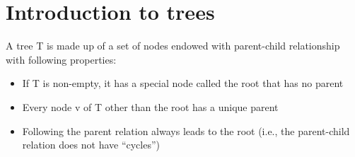 \documentclass[12pt]{article}
\newcommand{\1}{\space \quad}
\newcommand{\2}{\quad \quad \quad}
\newcommand{\3}{\quad \quad \quad \quad \space}
\newcommand{\4}{\quad \quad \quad \quad \quad \quad}
\begin{document}
\section{Introduction to trees}
A tree T is made up of a set of nodes endowed with parent-child relationship with following properties:
\begin{itemize}
  \item If T is non-empty, it has a special node called the root that has no parent
  \item Every node v of T other than the root has a unique parent
  \item Following the parent relation always leads to the root (i.e., the parent-child relation does not have “cycles”)
\end{itemize}
\end{document}
